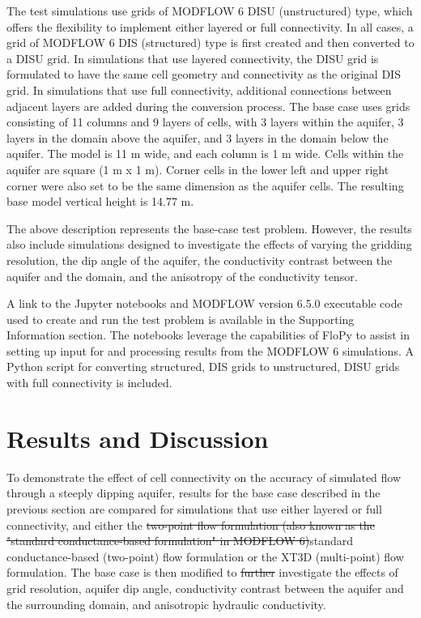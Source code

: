 \documentclass{article}
\begin{document}
The test simulations use grids of MODFLOW 6 DISU (unstructured) type, which offers the flexibility to implement either layered or full connectivity. In all cases, a grid of MODFLOW 6 DIS (structured) type is first created and then converted {\color{red}to} a DISU grid. In simulations that use layered connectivity, the DISU grid is formulated to have the same cell geometry and connectivity as the original DIS grid. In simulations that use full connectivity, additional connections between adjacent layers are added during the conversion process. The base case uses grids consisting of 11 columns and 9 layers of cells, with 3 layers within the aquifer, 3 layers in the domain above the aquifer, and 3 layers in the domain below the aquifer.  The model is 11 m wide, and each column is 1 m wide. Cells within the aquifer are square (1 m x 1 m). Corner cells in the lower left and upper right corner were also set to be the same dimension as the aquifer cells. The resulting base model vertical height is 14.77 m.  

The above description represents the base-case test problem. However, the results also include simulations designed to investigate the effects of varying the gridding resolution, the dip angle of the aquifer, the conductivity contrast between the aquifer and the domain, and the anisotropy of the conductivity tensor.

A link to the Jupyter notebooks {\color{red} \citep{jupyterproject}} and MODFLOW version 6.5.0 executable code used to create and run the test problem is available in the Supporting Information section. The notebooks leverage the capabilities of FloPy \citep{bakker2016scripting, hughes2024flopy} to assist in setting up input for and processing results from the MODFLOW 6 simulations. A Python {\color{red} \citep{pythonsoftware}} script for converting structured, DIS grids to unstructured, DISU grids with full connectivity is included.

\section*{Results and Discussion}

To demonstrate the effect of cell connectivity on the accuracy of simulated flow through a steeply dipping aquifer, results for the base case described in the previous section are compared for simulations that use either layered or full connectivity, and either the {\color{red} \sout{two-point flow formulation (also known as the "standard conductance-based formulation" in MODFLOW 6)}standard conductance-based (two-point) flow formulation} or the XT3D {\color{red}(multi-point)} flow formulation. The base case is then modified to {\color{red} \sout{further}} investigate the effects of grid resolution, aquifer dip angle, conductivity contrast between the aquifer and the surrounding domain, and anisotropic hydraulic conductivity.
\end{document}
